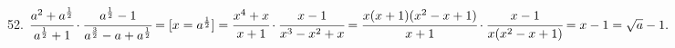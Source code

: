 52. $\cfrac{a^2+a^\frac{1}{2}}{a^\frac{1}{2}+1}\cdot\cfrac{a^\frac{1}{2}-1}{a^\frac{3}{2}-a+a^\frac{1}{2}}=
[x=a^\frac{1}{2}]=\cfrac{x^4+x}{x+1}\cdot\cfrac{x-1}{x^3-x^2+x}
=\cfrac{x(x+1)(x^2-x+1)}{x+1}\cdot\cfrac{x-1}{x(x^2-x+1)}=
x-1=\sqrt{a}-1.$\\
